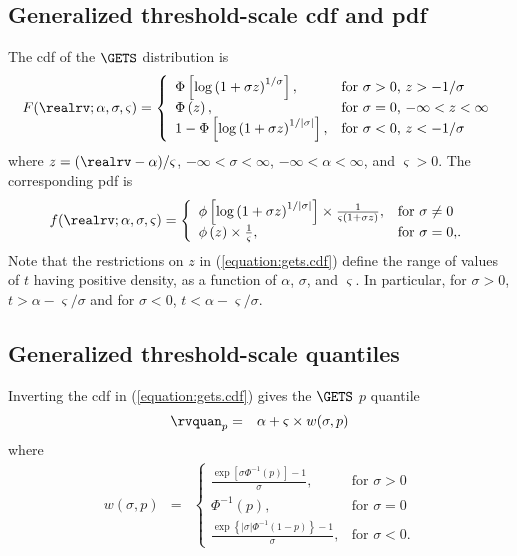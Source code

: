 \subsection{Generalized threshold-scale cdf and pdf}

The cdf of the $\GETS$ distribution is
\begin{equation} 
\label{equation:gets.cdf}
F(\realrv;\alpha, \sigma,\varsigma)= \left \{
\begin{array}{ll} \Phi \left [ \log \left ( 1+ \sigma z
           \right )^{1/\sigma}
\right ], & \mbox{for $\sigma>0$, $z>-1/\sigma$}\\
\Phi\left ( z\right ), & \mbox{for $\sigma=0$, $-\infty<  z <\infty$}\\
1-\Phi\left [ \log \left ( 1+ \sigma z \right )^{1/|\sigma|}
\right ], & \mbox{for $\sigma<0$, $z<-1/\sigma$}
\end{array}	
\right.
\end{equation}
where $z=(\realrv-\alpha)/\varsigma$,
$-\infty< \sigma <\infty$,
$-\infty<\alpha<\infty$, and $\varsigma>0$.
The corresponding pdf  is
\begin{displaymath}
\displaystyle
f(\realrv;\alpha, \sigma,\varsigma)=
\left \{
\begin{array}{ll}
\phi
\left [
\log \left ( 1+ \sigma z
           \right )^{1/|\sigma|}
\right ]
\times
\frac{1
     }
     {
 \varsigma (1+\sigma z)
     }, 
& \mbox{for $\sigma \ne 0$   }
\\
\phi
\left (
 z
\right )\times 
\frac{
1
     }
     {
\varsigma
     }, & \mbox{for $\sigma=0,$}.
\end{array}	
\right.
\end{displaymath}
Note that the restrictions on $z$ in (\ref{equation:gets.cdf})
define the range of values of $t$ having positive density, as a
function of $\alpha$, $\sigma$, and $\varsigma$.
In particular, for $\sigma>0$, $t> \alpha-\varsigma/\sigma$
and for $\sigma < 0$, $t <  \alpha-\varsigma/\sigma$.
\subsection{Generalized threshold-scale quantiles}
Inverting the cdf in (\ref{equation:gets.cdf})
gives the $\GETS$ $p$ quantile
\begin{eqnarray*}
\rvquan_{p}&=& \alpha+\varsigma \times w(\sigma,p)
\end{eqnarray*}
where
\begin{eqnarray*}
w(\sigma,p)&=&
\left \{
\begin{array}{ll}
 \frac{\exp[\sigma \Phi^{-1}(p)]-1}
			   {\sigma},
 & \mbox{for $\sigma>0$}
\\[1ex]
\Phi^{-1}(p),  & 
\mbox{for $\sigma=0$}
\\[1ex]
\frac{\exp \left \{| \sigma  | \Phi^{-1}(1-p)
			         \right \}-1}
			   {\sigma},  & \mbox{for $\sigma<0$}.
\end{array}	
\right.
\end{eqnarray*}

